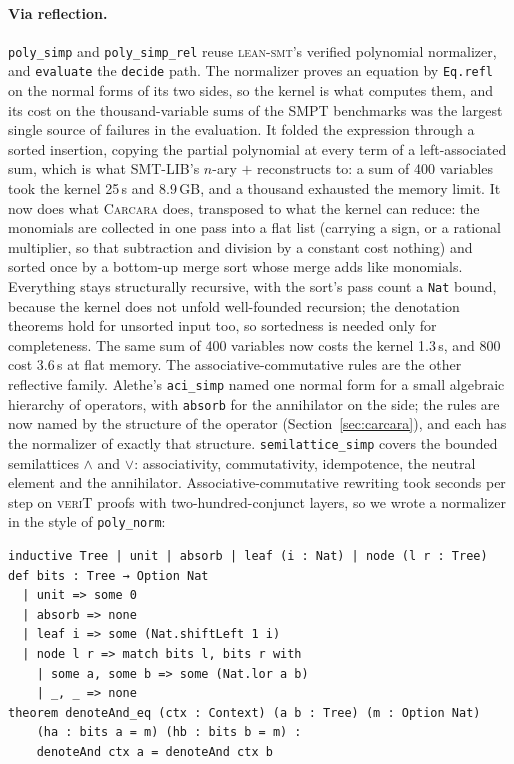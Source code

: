\documentclass[runningheads]{llncs}
\newcommand{\tactic}{\textsc{lean-smt}\xspace}
\newcommand{\carcara}{\textsc{Carcara}\xspace}
\newcommand{\verit}{\textsc{veriT}\xspace}
\newcommand{\alethe}{Alethe\xspace}
\newcommand{\rulename}[1]{\texttt{#1}}
\begin{document}
\paragraph{Via reflection.} \rulename{poly\_simp} and \rulename{poly\_simp\_rel}
reuse \tactic's verified polynomial normalizer, and \rulename{evaluate} the
\texttt{decide} path. The normalizer proves an equation by \lstinline{Eq.refl}
on the normal forms of its two sides, so the kernel is what computes them,
and its cost on the thousand-variable sums of the SMPT benchmarks was the
largest single source of failures in the evaluation. It folded the expression
through a sorted insertion, copying the partial polynomial at every term of a
left-associated sum, which is what SMT-LIB's $n$-ary $+$ reconstructs to: a
sum of 400 variables took the kernel 25\,s and 8.9\,GB, and a thousand
exhausted the memory limit. It now does what \carcara does, transposed to what
the kernel can reduce: the monomials are collected in one pass into a flat
list (carrying a sign, or a rational multiplier, so that subtraction and
division by a constant cost nothing) and sorted once by a bottom-up merge sort
whose merge adds like monomials. Everything stays structurally recursive,
with the sort's pass count a \lstinline{Nat} bound, because the kernel does
not unfold well-founded recursion; the denotation theorems hold for unsorted
input too, so sortedness is needed only for completeness. The same sum of
400 variables now costs the kernel 1.3\,s, and 800 cost 3.6\,s at flat
memory. The associative-commutative rules are the other reflective family.
\alethe's \rulename{aci\_simp} named one normal form for a small algebraic
hierarchy of operators, with \rulename{absorb} for the annihilator on the
side; the rules are now named by the structure of the operator
(Section~\ref{sec:carcara}), and each has the normalizer of exactly that
structure. \rulename{semilattice\_simp} covers the bounded semilattices
$\wedge$ and $\vee$: associativity, commutativity, idempotence, the neutral
element and the annihilator. Associative-commutative rewriting took seconds
per step on \verit proofs with two-hundred-conjunct layers, so we wrote a
normalizer in the style of \texttt{poly\_norm}:
\begin{lstlisting}
inductive Tree | unit | absorb | leaf (i : Nat) | node (l r : Tree)
def bits : Tree → Option Nat
  | unit => some 0
  | absorb => none
  | leaf i => some (Nat.shiftLeft 1 i)
  | node l r => match bits l, bits r with
    | some a, some b => some (Nat.lor a b)
    | _, _ => none
theorem denoteAnd_eq (ctx : Context) (a b : Tree) (m : Option Nat)
    (ha : bits a = m) (hb : bits b = m) :
    denoteAnd ctx a = denoteAnd ctx b
\end{lstlisting}
\end{document}
